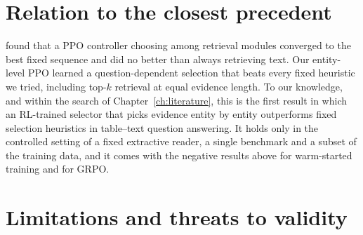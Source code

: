 \section{Relation to the closest precedent}

\citet{jose2024qatexttablesdrl} found that a PPO controller choosing among retrieval modules converged to the best fixed sequence and did no better than always retrieving text. Our entity-level PPO learned a question-dependent selection that beats every fixed heuristic we tried, including top-$k$ retrieval at equal evidence length. To our knowledge, and within the search of Chapter~\ref{ch:literature}, this is the first result in which an RL-trained selector that picks evidence entity by entity outperforms fixed selection heuristics in table--text question answering. It holds only in the controlled setting of a fixed extractive reader, a single benchmark and a subset of the training data, and it comes with the negative results above for warm-started training and for GRPO.

\section{Limitations and threats to validity}

